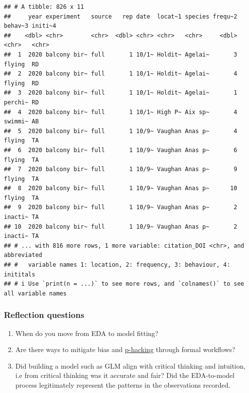 \documentclass[
]{book}
\providecommand{\tightlist}{%
  \setlength{\itemsep}{0pt}\setlength{\parskip}{0pt}}
\begin{document}
\begin{verbatim}
## # A tibble: 826 x 11
##     year experiment   source   rep date  locat~1 species frequ~2 behav~3 initi~4
##    <dbl> <chr>        <chr>  <dbl> <chr> <chr>   <chr>     <dbl> <chr>   <chr>  
##  1  2020 balcony bir~ full       1 10/1~ Holdit~ Agelai~       3 flying  RD     
##  2  2020 balcony bir~ full       1 10/1~ Holdit~ Agelai~       4 flying  RD     
##  3  2020 balcony bir~ full       1 10/1~ Holdit~ Agelai~       1 perchi~ RD     
##  4  2020 balcony bir~ full       1 10/1~ High P~ Aix sp~       4 swimmi~ AB     
##  5  2020 balcony bir~ full       1 10/9~ Vaughan Anas p~       4 flying  TA     
##  6  2020 balcony bir~ full       1 10/9~ Vaughan Anas p~       6 flying  TA     
##  7  2020 balcony bir~ full       1 10/9~ Vaughan Anas p~       9 flying  TA     
##  8  2020 balcony bir~ full       1 10/9~ Vaughan Anas p~      10 flying  TA     
##  9  2020 balcony bir~ full       1 10/9~ Vaughan Anas p~       2 inacti~ TA     
## 10  2020 balcony bir~ full       1 10/9~ Vaughan Anas p~       2 inacti~ TA     
## # ... with 816 more rows, 1 more variable: citation_DOI <chr>, and abbreviated
## #   variable names 1: location, 2: frequency, 3: behaviour, 4: inititals
## # i Use `print(n = ...)` to see more rows, and `colnames()` to see all variable names
\end{verbatim}

\hypertarget{reflection-questions-3}{%
\subsubsection*{Reflection questions}\label{reflection-questions-3}}

\begin{enumerate}
\def\labelenumi{\arabic{enumi}.}
\tightlist
\item
  When do you move from EDA to model fitting?\\
\item
  Are there ways to mitigate bias and \href{https://www.wired.com/story/were-all-p-hacking-now/}{p-hacking} through formal workflows?\\
\item
  Did building a model such as GLM align with critical thinking and intuition, i.e from critical thinking was it accurate and fair? Did the EDA-to-model process legitimately represent the patterns in the observations recorded.
\end{enumerate}
\end{document}

